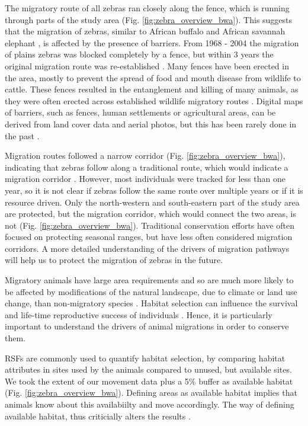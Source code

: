 \documentclass[12pt,a4paper, twoside, english]{article}
\begin{document}
The migratory route of all zebras ran closely along the fence, which is running through parts of the study area (Fig. \ref{fig:zebra_overview_bwa}). This suggests that the migration of zebras, similar to African buffalo and African savannah elephant \citep{Loarie2009a}, is affected by the presence of barriers. From 1968 - 2004 the migration of plains zebras was blocked completely by a fence, but within 3 years the original migration route was re-established \citep{Bartlam-Brooks2011}. Many fences have been erected in the area, mostly to prevent the spread of food and mouth disease from wildlife to cattle. These fences resulted in the entanglement and killing of many animals, as they were often erected across established wildlife migratory routes \citep{Perkins1996, Kgathi2014}. Digital maps of barriers, such as fences, human settlements or agricultural areas, can be derived from land cover data and aerial photos, but this has been rarely done in the past \citep{Neumann2015a}.

Migration routes followed a narrow corridor (Fig. \ref{fig:zebra_overview_bwa}), indicating that zebras follow along a traditional route, which would indicate a migration corridor \citep{Berger2004}. However, most individuals were tracked for less than one year, so it is not clear if zebras follow the same route over multiple years or if it is resource driven. Only the north-western and south-eastern part of the study area are protected, but the migration corridor, which would connect the two areas, is not (Fig. \ref{fig:zebra_overview_bwa}). Traditional conservation efforts have often focused on protecting seasonal ranges, but have less often considered migration corridors. A more detailed understanding of the drivers of migration pathways will help us to protect the migration of zebras in the future.


Migratory animals have large area requirements and so are much more likely to be affected by modifications of the natural landscape, due to climate or land use change, than non-migratory species \citep{Berger2004, Bolger2008, Wilcove2008}. Habitat selection can influence the survival and life-time reproductive success of individuals \citep{Makelainen2016}. Hence, it is particularly important to understand the drivers of animal migrations in order to conserve them.

RSFs are commonly used to quantify habitat selection, by comparing habitat attributes in sites used by the animals compared to unused, but available sites. We took the extent of our movement data plus a 5\% buffer as available habitat (Fig. \ref{fig:zebra_overview_bwa}). Defining areas as available habitat implies that animals know about this availabiilty and move accordingly. The way of defining available habitat, thus criticially alters the results \citep{Freitas2008a}. 
\end{document}
